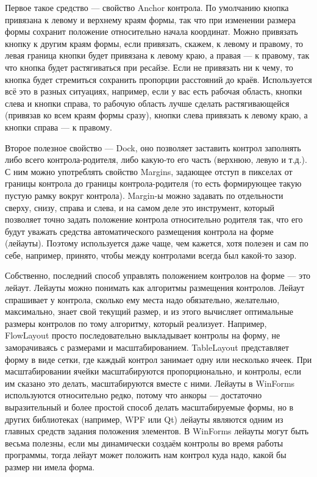 \documentclass[a5paper]{article}
\begin{document}
Первое такое средство --- свойство Anchor контрола. По умолчанию кнопка привязана к левому и верхнему краям формы, так что при изменении размера формы сохранит положение относительно начала координат. Можно привязать кнопку к другим краям формы, если привязать, скажем, к левому и правому, то левая граница кнопки будет привязана к левому краю, а правая --- к правому, так что кнопка будет растягиваться при ресайзе. Если не привязать ни к чему, то кнопка будет стремиться сохранить пропорции расстояний до краёв. Используется всё это в разных ситуациях, например, если у вас есть рабочая область, кнопки слева и кнопки справа, то рабочую область лучше сделать растягивающейся (привязав ко всем краям формы сразу), кнопки слева привязать к левому краю, а кнопки справа --- к правому.

Второе полезное свойство --- Dock, оно позволяет заставить контрол заполнять либо всего контрола-родителя, либо какую-то его часть (верхнюю, левую и т.д.). С ним можно употреблять свойство Margins, задающее отступ в пикселах от границы контрола до границы контрола-родителя (то есть формирующее такую пустую рамку вокруг контрола). Margin-ы можно задавать по отдельности сверху, снизу, справа и слева, и на самом деле это инструмент, который позволяет точно задать положение контрола относительно родителя так, что его будут уважать средства автоматического размещения контрола на форме (лейауты). Поэтому используется даже чаще, чем кажется, хотя полезен и сам по себе, например, принято, чтобы между контролами всегда был какой-то зазор.

Собственно, последний способ управлять положением контролов на форме --- это лейаут. Лейауты можно понимать как алгоритмы размещения контролов. Лейаут спрашивает у контрола, сколько ему места надо обязательно, желательно, максимально, знает свой текущий размер, и из этого вычисляет оптимальные размеры контролов по тому алгоритму, который реализует. Например, FlowLayout просто последовательно выкладывает контролы на форму, не заморачиваясь с размерами и масштабированием. TableLayout представляет форму в виде сетки, где каждый контрол занимает одну или несколько ячеек. При масштабировании ячейки масштабируются пропорционально, и контролы, если им сказано это делать, масштабируются вместе с ними. Лейауты в WinForms используются относительно редко, потому что анкоры --- достаточно выразительный и более простой способ делать масштабируемые формы, но в других библиотеках (например, WPF или Qt) лейауты являются одним из главных средств задания положения элементов. В WinForms лейауты могут быть весьма полезны, если мы динамически создаём контролы во время работы программы, тогда лейаут может положить нам контрол куда надо, какой бы размер ни имела форма.
\end{document}
